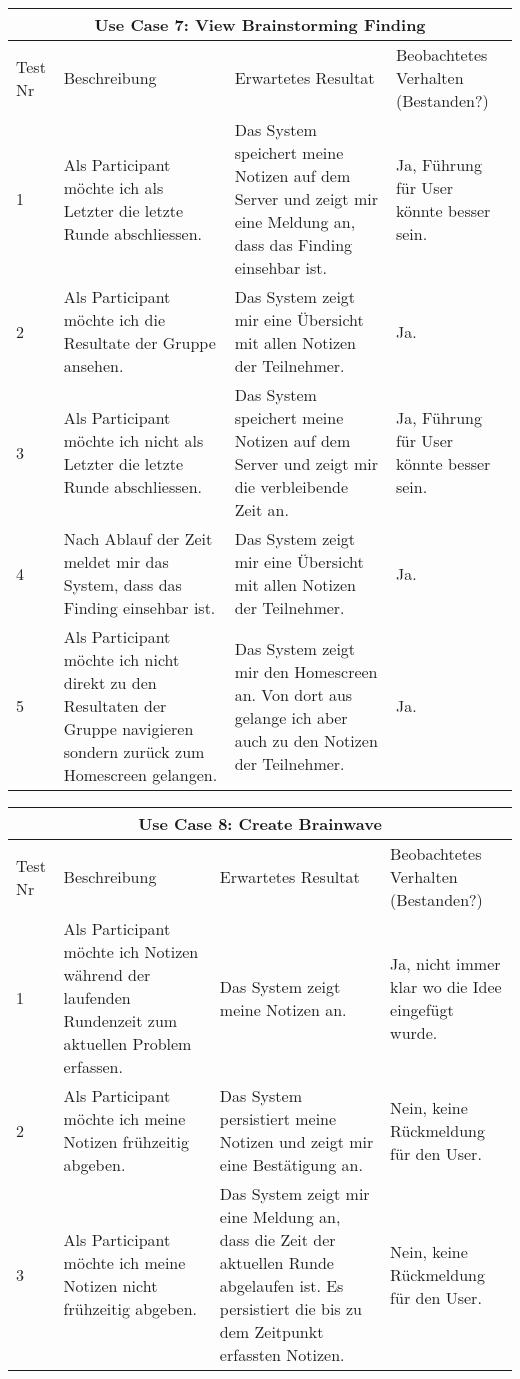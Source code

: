 \renewcommand{\arraystretch}{1.35}
\begin{center}
	\begin{longtable}{| p{1cm} | p{4cm} | p{5cm} | p{3cm} |}
		\hline
		\multicolumn{4}{|c|}{\textbf{Use Case 7: View Brainstorming Finding}}\\
		\hline\hline
		Test Nr & Beschreibung & Erwartetes Resultat & Beo\-bach\-te\-tes Verhalten (Bestanden?) \\
		\hline
		1 & Als Participant möchte ich als Letzter die letzte Runde abschliessen. & Das System speichert meine Notizen auf dem Server und zeigt mir eine Meldung an, dass das Finding einsehbar ist. & Ja, Führung für User könnte besser sein. \\
		\hline
		2 & Als Participant möchte ich die Resultate der Gruppe ansehen. & Das System zeigt mir eine Übersicht mit allen Notizen der Teilnehmer. & Ja.\\
		\hline
		3 & Als Participant möchte ich nicht als Letzter die letzte Runde abschliessen. & Das System speichert meine Notizen auf dem Server und zeigt mir die verbleibende Zeit an. & Ja, Führung für User könnte besser sein.\\
		\hline
		4 & Nach Ablauf der Zeit meldet mir das System, dass das Finding einsehbar ist. & Das System zeigt mir eine Übersicht mit allen Notizen der Teilnehmer. & Ja.\\
		\hline
		5 & Als Participant möchte ich nicht direkt zu den Resultaten der Gruppe navigieren sondern zurück zum Homescreen gelangen. & Das System zeigt mir den Homescreen an. Von dort aus gelange ich aber auch zu den Notizen der Teilnehmer. & Ja.  \\
		\hline
	\end{longtable}
\end{center}


\renewcommand{\arraystretch}{1.35}
\begin{center}
	\begin{longtable}{| p{1cm} | p{4cm} | p{5cm} | p{3cm} |}
		\hline
		\multicolumn{4}{|c|}{\textbf{Use Case 8: Create Brainwave}}\\
		\hline\hline
		Test Nr & Beschreibung & Erwartetes Resultat & Beo\-bach\-te\-tes Verhalten (Bestanden?) \\
		\hline
		1 & Als Participant möchte ich Notizen während der laufenden Rundenzeit zum aktuellen Problem erfassen. & Das System zeigt meine Notizen an. & Ja, nicht immer klar wo die Idee eingefügt wurde. \\
		\hline
		2 & Als Participant möchte ich meine Notizen frühzeitig abgeben. & Das System persistiert meine Notizen und zeigt mir eine Bestätigung an. & Nein, keine Rückmel\-dung für den User.\\
		\hline
		3 & Als Participant möchte ich meine Notizen nicht frühzeitig abgeben. & Das System zeigt mir eine Meldung an, dass die Zeit der aktuellen Runde abgelaufen ist. Es persistiert die bis zu dem Zeitpunkt erfassten Notizen. & Nein, keine Rückmel\-dung für den User. \\
		\hline
	\end{longtable}
\end{center}

